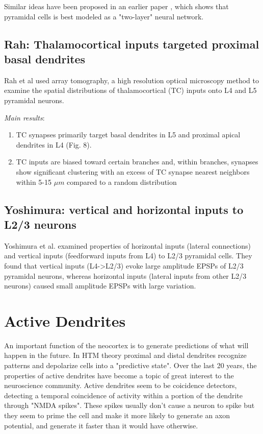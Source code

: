 \documentclass{article} %
\begin{document}
Similar ideas have been proposed in an earlier paper \cite{Poirazi2003}, which
shows that pyramidal cells is best modeled as a "two-layer" neural network. 

\subsection{Rah: Thalamocortical inputs targeted proximal basal dendrites}
Rah et al \cite{Rah2013} used array tomography, a high resolution optical 
microscopy method to examine the spatial distributions of thalamocortical (TC) 
inputs onto L4 and L5 pyramidal neurons. 

\emph{Main results}:
\begin{enumerate}
\item TC synapses primarily target basal dendrites in L5 and proximal apical
dendrites in L4 (Fig. 8).
\item TC inputs are biased toward certain branches and, within branches,
synapses show significant clustering with an excess of TC synapse nearest 
neighbors within 5-15 $\mu m$ compared to a random distribution
\end{enumerate}

\subsection{Yoshimura: vertical and horizontal inputs to L2/3 neurons}

Yoshimura et al. \cite{Yoshimura2000} examined properties of horizontal inputs 
(lateral connections) and vertical inputs (feedforward inputs from L4) to L2/3 
pyramidal cells. They found that vertical inputs (L4->L2/3) evoke large amplitude 
EPSPs of L2/3 pyramidal neurons, whereas horizontal inputs 
(lateral inputs from other L2/3 neurons) caused small amplitude EPSPs with 
large variation.

\section{Active Dendrites}

An important function of the neocortex is to generate predictions of what will
happen in the future. In HTM theory proximal and distal dendrites recognize
patterns and depolarize cells into a "predictive state". Over the last 20 years,
the properties of active dendrites have become a topic of great  interest to the
neuroscience community. Active dendrites seem to be coicidence detectors,
detecting a temporal coincidence of activity within a portion of the dendrite
through "NMDA spikes". These spikes usually don't cause a neuron to spike but
they  seem to prime the cell and make it more likely to generate an axon
potential, and generate it faster than it would have otherwise.
\end{document}
